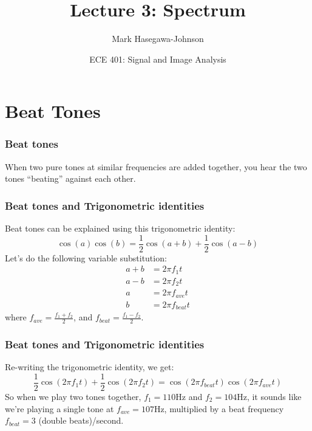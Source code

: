 \documentclass{beamer}
\title{Lecture 3: Spectrum}
\author{Mark Hasegawa-Johnson}
\date{ECE 401: Signal and Image Analysis}
\begin{document}
\begin{frame}
  \maketitle
\end{frame}

\begin{frame}
  \tableofcontents
\end{frame}

\section[Beating]{Beat Tones}
\setcounter{subsection}{1}

\begin{frame}
  \frametitle{Beat tones}

  When two pure tones at similar frequencies are added together, you hear the  two tones
  ``beating'' against each other.
  \vspace*{1cm}
  \centerline{}
\end{frame}

\begin{frame}
  \frametitle{Beat tones and Trigonometric identities}

  Beat tones can be explained using this trigonometric identity:
  \[
  \cos(a)\cos(b)=\frac{1}{2}\cos(a+b)+\frac{1}{2}\cos(a-b)
  \]
  Let's do the following variable substitution:
  \begin{align*}
    a+b &= 2\pi f_1 t\\
    a-b &= 2\pi f_2 t\\
    a &= 2\pi f_{ave}t\\
    b &= 2\pi f_{beat}t
  \end{align*}
  where $f_{ave}=\frac{f_1+f_2}{2}$, and $f_{beat}=\frac{f_1-f_2}{2}$.
\end{frame}

\begin{frame}
  \frametitle{Beat tones and Trigonometric identities}

  Re-writing the trigonometric identity, we get:
  \[
  \frac{1}{2}\cos(2\pi f_1t)+\frac{1}{2}\cos(2\pi f_2 t) = \cos(2\pi f_{beat}t)\cos(2\pi f_{ave}t)
  \]
  So when we play two tones together, $f_1=110$Hz and $f_2=104$Hz, it
  sounds like we're playing a single tone at $f_{ave}=107$Hz,
  multiplied by a beat frequency $f_{beat}=3$ (double beats)/second.
\end{frame}
\end{document}
